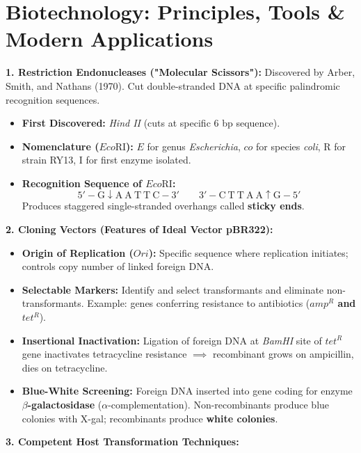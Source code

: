 \documentclass[10pt,a4paper]{article}
\begin{document}
\section{Biotechnology: Principles, Tools \& Modern Applications}

\begin{conceptbox}
\textbf{1. Restriction Endonucleases ("Molecular Scissors"):}
Discovered by Arber, Smith, and Nathans (1970). Cut double-stranded DNA at specific palindromic recognition sequences.
\begin{itemize}
  \item \textbf{First Discovered:} \textit{Hind II} (cuts at specific 6 bp sequence).
  \item \textbf{Nomenclature ($Eco\mathrm{RI}$):} $E$ for genus \textit{Escherichia}, $co$ for species \textit{coli}, $\mathrm{R}$ for strain RY13, $\mathrm{I}$ for first enzyme isolated.
  \item \textbf{Recognition Sequence of $Eco\mathrm{RI}$:}
  \begin{equation}
    5'-\mathrm{G \downarrow A \ A \ T \ T \ C}-3' \qquad 3'-\mathrm{C \ T \ T \ A \ A \uparrow G}-5'
  \end{equation}
  Produces staggered single-stranded overhangs called \textbf{sticky ends}.
\end{itemize}
\textbf{2. Cloning Vectors (Features of Ideal Vector pBR322):}
\begin{itemize}
  \item \textbf{Origin of Replication ($Ori$):} Specific sequence where replication initiates; controls copy number of linked foreign DNA.
  \item \textbf{Selectable Markers:} Identify and select transformants and eliminate non-transformants. Example: genes conferring resistance to antibiotics (\textbf{$amp^R$ and $tet^R$}).
  \item \textbf{Insertional Inactivation:} Ligation of foreign DNA at \textit{BamHI} site of $tet^R$ gene inactivates tetracycline resistance $\implies$ recombinant grows on ampicillin, dies on tetracycline.
  \item \textbf{Blue-White Screening:} Foreign DNA inserted into gene coding for enzyme \textbf{$\beta$-galactosidase} ($\alpha$-complementation). Non-recombinants produce blue colonies with X-gal; recombinants produce \textbf{white colonies}.
\end{itemize}
\textbf{3. Competent Host Transformation Techniques:}
\begin{itemize}

\end{itemize}
\end{conceptbox}
\end{document}
